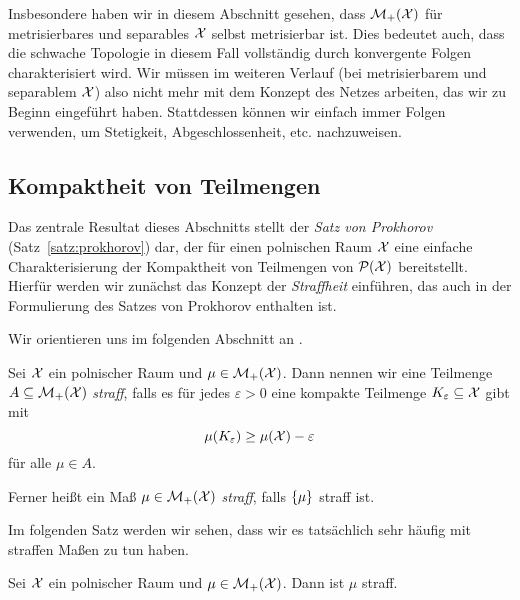 \documentclass[../main/main.tex]{subfiles}
\begin{document}
	Insbesondere haben wir in diesem Abschnitt gesehen, dass $\mathcal{M}_{+}(\mathcal{X})$ für metrisierbares und separables $\mathcal{X}$ selbst metrisierbar ist. Dies bedeutet auch, dass die schwache Topologie
	in diesem Fall vollständig durch konvergente Folgen charakterisiert wird. Wir müssen im weiteren Verlauf (bei metrisierbarem und separablem $\mathcal{X}$) also nicht mehr mit dem Konzept des Netzes arbeiten, das wir zu Beginn eingeführt haben. Stattdessen
	können wir einfach immer Folgen verwenden, um Stetigkeit, Abgeschlossenheit, etc. nachzuweisen.

	\subsection{Kompaktheit von Teilmengen}
	\label{subsec:kompaktheit_von_teilmengen}
	
	Das zentrale Resultat dieses Abschnitts stellt der \emph{Satz von Prokhorov} (Satz~\ref{satz:prokhorov}) dar, der für einen polnischen Raum $\mathcal{X}$ eine einfache Charakterisierung der Kompaktheit von Teilmengen von $\mathcal{P}(\mathcal{X})$ bereitstellt. Hierfür werden wir zunächst das Konzept der \emph{Straffheit} einführen, das auch in der Formulierung des Satzes von Prokhorov enthalten ist.
	
	Wir orientieren uns im folgenden Abschnitt an \cite[Kapitel 4.14]{Simon.2015}.
	
	\begin{Definition}
		Sei $\mathcal{X}$ ein polnischer Raum und $\mu \in \mathcal{M}_{+}(\mathcal{X})$. Dann nennen wir 
		eine Teilmenge $A \subseteq \mathcal{M}_{+}(\mathcal{X})$ \emph{straff}, falls es für jedes $\varepsilon > 0$ eine kompakte Teilmenge
		$K_\varepsilon \subseteq \mathcal{X}$ gibt mit 
		\[ \mu(K_\varepsilon) \geq \mu(\mathcal{X})  - \varepsilon \]
		für alle $\mu \in A$.
		
		Ferner heißt ein Maß $\mu \in \mathcal{M}_{+}(\mathcal{X})$ \emph{straff}, falls $\left\{\mu\right\}$ straff ist.
	\end{Definition}
	
	Im folgenden Satz werden wir sehen, dass wir es tatsächlich sehr häufig mit straffen Maßen zu tun haben.
	
	\begin{Satz}
		\label{satz:straffheit}
		Sei $\mathcal{X}$ ein polnischer Raum und $\mu \in \mathcal{M}_{+}(\mathcal{X})$. Dann ist $\mu$ straff.
	\end{Satz}
	
\end{document}
